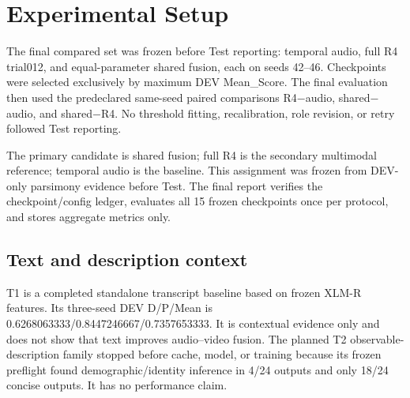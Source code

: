 \section{Experimental Setup}
\label{sec:experiments}

The final compared set was frozen before Test reporting: temporal audio, full R4 trial012, and equal-parameter shared fusion, each on seeds 42--46. Checkpoints were selected exclusively by maximum DEV Mean\_Score. The final evaluation then used the predeclared same-seed paired comparisons R4$-$audio, shared$-$audio, and shared$-$R4. No threshold fitting, recalibration, role revision, or retry followed Test reporting.

The primary candidate is shared fusion; full R4 is the secondary multimodal reference; temporal audio is the baseline. This assignment was frozen from DEV-only parsimony evidence before Test. The final report verifies the checkpoint/config ledger, evaluates all 15 frozen checkpoints once per protocol, and stores aggregate metrics only.

\subsection{Text and description context}
T1 is a completed standalone transcript baseline based on frozen XLM-R features. Its three-seed DEV D/P/Mean is 0.6268063333/0.8447246667/0.7357653333. It is contextual evidence only and does not show that text improves audio--video fusion. The planned T2 observable-description family stopped before cache, model, or training because its frozen preflight found demographic/identity inference in 4/24 outputs and only 18/24 concise outputs. It has no performance claim.
